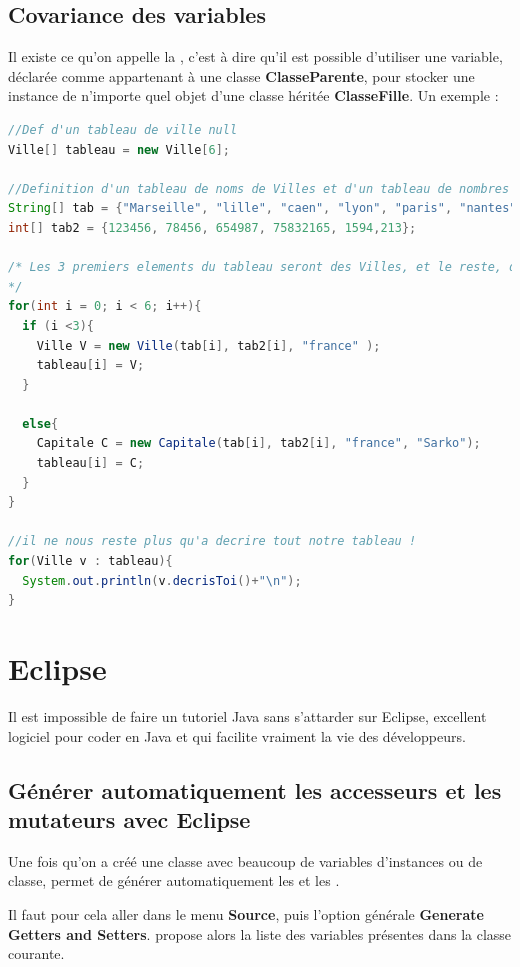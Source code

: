 \documentclass[a4paper,twoside]{article}
\begin{document}
\subsection{Covariance des variables}
Il existe ce qu'on appelle la , c'est à dire qu'il est possible d'utiliser une variable, déclarée comme appartenant à une classe \textbf{ClasseParente}, pour stocker une instance de n'importe quel objet d'une classe héritée \textbf{ClasseFille}. Un exemple :
\begin{lstlisting}[language=java]
//Def d'un tableau de ville null
Ville[] tableau = new Ville[6];
    
//Definition d'un tableau de noms de Villes et d'un tableau de nombres d'habitants
String[] tab = {"Marseille", "lille", "caen", "lyon", "paris", "nantes"};
int[] tab2 = {123456, 78456, 654987, 75832165, 1594,213};

/* Les 3 premiers elements du tableau seront des Villes, et le reste, des capitales
*/
for(int i = 0; i < 6; i++){
  if (i <3){
    Ville V = new Ville(tab[i], tab2[i], "france" );
    tableau[i] = V;
  }

  else{
    Capitale C = new Capitale(tab[i], tab2[i], "france", "Sarko");
    tableau[i] = C;
  }
}

//il ne nous reste plus qu'a decrire tout notre tableau !
for(Ville v : tableau){
  System.out.println(v.decrisToi()+"\n");
}
\end{lstlisting}

\section{Eclipse}
Il est impossible de faire un tutoriel Java sans s'attarder sur Eclipse, excellent logiciel pour coder en Java et qui facilite vraiment la vie des développeurs.

\subsection{Générer automatiquement les accesseurs et les mutateurs avec Eclipse}
Une fois qu'on a créé une classe avec beaucoup de variables d'instances ou de classe,  permet de générer automatiquement les  et les . 

Il faut pour cela aller dans le menu \textbf{Source}, puis l'option générale \textbf{Generate Getters and Setters}.  propose alors la liste des variables présentes dans la classe courante.
\end{document}
